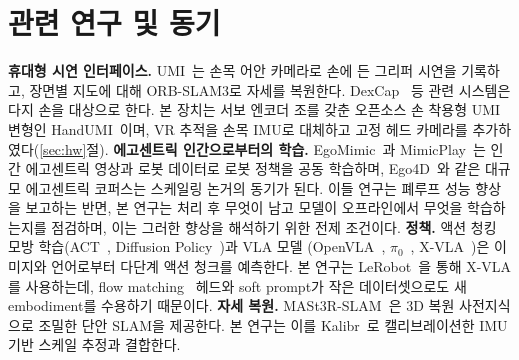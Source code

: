 \documentclass[conference,10pt]{IEEEtran}
\begin{document}
\section{관련 연구 및 동기}
\textbf{휴대형 시연 인터페이스.} UMI~\cite{chi2024umi}는 손목 어안 카메라로 손에 든 그리퍼 시연을 기록하고, 장면별 지도에 대해
ORB-SLAM3로 자세를 복원한다. DexCap~\cite{wang2024dexcap} 등 관련 시스템은 다지 손을 대상으로 한다. 본 장치는 서보 엔코더 조를 갖춘
오픈소스 손 착용형 UMI 변형인 HandUMI~\cite{handumi_hw}이며, VR 추적을 손목 IMU로 대체하고 고정 헤드 카메라를 추가하였다(\ref{sec:hw}절).
\textbf{에고센트릭 인간으로부터의 학습.} EgoMimic~\cite{kareer2024egomimic}과 MimicPlay~\cite{wang2023mimicplay}는 인간 에고센트릭
영상과 로봇 데이터로 로봇 정책을 공동 학습하며, Ego4D~\cite{grauman2022ego4d}와 같은 대규모 에고센트릭 코퍼스는 스케일링 논거의
동기가 된다. 이들 연구는 폐루프 성능 향상을 보고하는 반면, 본 연구는 처리 후 무엇이 남고 모델이 오프라인에서 무엇을 학습하는지를
점검하며, 이는 그러한 향상을 해석하기 위한 전제 조건이다.
\textbf{정책.} 액션 청킹 모방 학습(ACT~\cite{zhao2023act}, Diffusion Policy~\cite{chi2023diffusion})과 VLA 모델
(OpenVLA~\cite{kim2024openvla}, $\pi_0$~\cite{black2024pi0}, X-VLA~\cite{zheng2025xvla})은 이미지와 언어로부터 다단계 액션 청크를
예측한다. 본 연구는 LeRobot~\cite{cadene2024lerobot}을 통해 X-VLA를 사용하는데, flow matching~\cite{lipman2023flow} 헤드와
soft prompt가 작은 데이터셋으로도 새 embodiment를 수용하기 때문이다.
\textbf{자세 복원.} MASt3R-SLAM~\cite{murai2025mast3rslam}은 3D 복원 사전지식으로 조밀한 단안 SLAM을 제공한다. 본 연구는 이를
Kalibr~\cite{furgale2013kalibr}로 캘리브레이션한 IMU 기반 스케일 추정과 결합한다.
\end{document}

